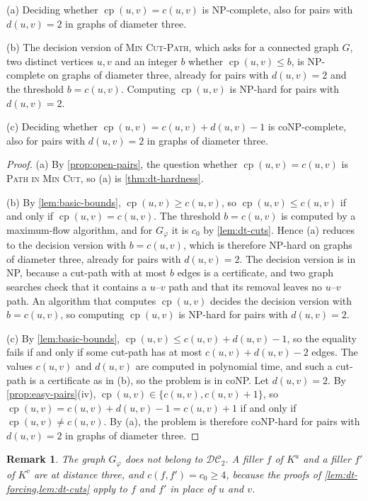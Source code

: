 \documentclass[pdflatex,sn-mathphys-num]{sn-jnl}%
\theoremstyle{thmstyleone}%
\theoremstyle{thmstyletwo}%
\newtheorem{remark}{Remark}%
\theoremstyle{thmstylethree}%
\newcommand{\cp}{\operatorname{cp}}%
\newcommand{\DC}{\mathcal{DC}_2}%
\newcommand{\MinCutPath}{\textsc{Min Cut-Path}}%
\newcommand{\PathInMinCut}{\textsc{Path in Min Cut}}%
\begin{document}
\begin{corollary}
\label{cor:dt-consequences}
(a) Deciding whether $\cp(u, v) = c(u, v)$ is NP-complete, also for pairs with $d(u, v) = 2$ in graphs of diameter three.

(b) The decision version of \MinCutPath{}, which asks for a connected graph $G$, two distinct vertices $u, v$ and an integer $b$ whether $\cp(u, v) \leq b$, is NP-complete on graphs of diameter three, already for pairs with $d(u, v) = 2$ and the threshold $b = c(u, v)$.
Computing $\cp(u, v)$ is NP-hard for pairs with $d(u, v) = 2$.

(c) Deciding whether $\cp(u, v) = c(u, v) + d(u, v) - 1$ is coNP-complete, also for pairs with $d(u, v) = 2$ in graphs of diameter three.
\end{corollary}

\begin{proof}
(a) By \cref{prop:open-pairs}, the question whether $\cp(u, v) = c(u, v)$ is \PathInMinCut{}, so (a) is \cref{thm:dt-hardness}.

(b) By \cref{lem:basic-bounds}, $\cp(u, v) \geq c(u, v)$, so $\cp(u, v) \leq c(u, v)$ if and only if $\cp(u, v) = c(u, v)$.
The threshold $b = c(u, v)$ is computed by a maximum-flow algorithm, and for $G_\varphi$ it is $c_0$ by \cref{lem:dt-cuts}.
Hence (a) reduces to the decision version with $b = c(u, v)$, which is therefore NP-hard on graphs of diameter three, already for pairs with $d(u, v) = 2$.
The decision version is in NP, because a cut-path with at most $b$ edges is a certificate, and two graph searches check that it contains a $u$--$v$ path and that its removal leaves no $u$--$v$ path.
An algorithm that computes $\cp(u, v)$ decides the decision version with $b = c(u, v)$, so computing $\cp(u, v)$ is NP-hard for pairs with $d(u, v) = 2$.

(c) By \cref{lem:basic-bounds}, $\cp(u, v) \leq c(u, v) + d(u, v) - 1$, so the equality fails if and only if some cut-path has at most $c(u, v) + d(u, v) - 2$ edges.
The values $c(u, v)$ and $d(u, v)$ are computed in polynomial time, and such a cut-path is a certificate as in (b), so the problem is in coNP.
Let $d(u, v) = 2$.
By \cref{prop:easy-pairs}(iv), $\cp(u, v) \in \{c(u, v), c(u, v) + 1\}$, so $\cp(u, v) = c(u, v) + d(u, v) - 1 = c(u, v) + 1$ if and only if $\cp(u, v) \neq c(u, v)$.
By (a), the problem is therefore coNP-hard for pairs with $d(u, v) = 2$ in graphs of diameter three.
\end{proof}

\begin{remark}
\label{rem:dt-not-in-dc}
The graph $G_\varphi$ does not belong to $\DC$.
A filler $f$ of $K^u$ and a filler $f'$ of $K^v$ are at distance three, and $c(f, f') = c_0 \geq 4$, because the proofs of \cref{lem:dt-forcing,lem:dt-cuts} apply to $f$ and $f'$ in place of $u$ and $v$.
\end{remark}
\end{document}
